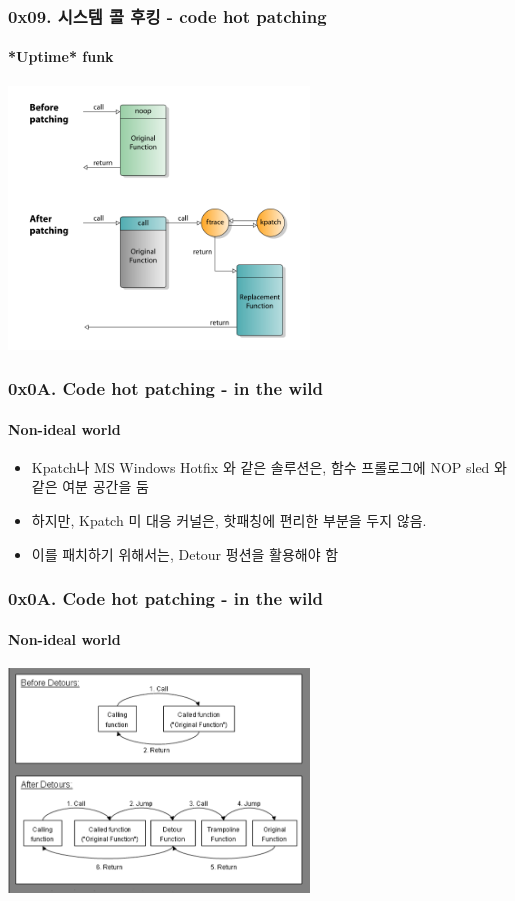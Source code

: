 \begin{frame}
  \frametitle{0x09. 시스템 콜 후킹 - code hot patching}
  \framesubtitle{*Uptime* funk}

  \begin{center}
    \includegraphics [width=80mm]{img/Linux_kernel_live_patching_kpatch.png}\cite{kpatch}
  \end{center}
\end{frame}

\begin{frame}
  \frametitle{0x0A. Code hot patching - in the wild}
  \framesubtitle{Non-ideal world}

  \begin{itemize}
  \item <1-> Kpatch나 MS Windows Hotfix 와 같은 솔루션은, 함수 프롤로그에 NOP sled 와 같은 여분 공간을 둠
  \item <2-> 하지만, Kpatch 미 대응 커널은, 핫패칭에 편리한 부분을 두지 않음.
  \item <3-> 이를 패치하기 위해서는, Detour 펑션을 활용해야 함
  \end{itemize}
\end{frame}

\begin{frame}
  \frametitle{0x0A. Code hot patching - in the wild}
  \framesubtitle{Non-ideal world}

  \begin{center}
    \includegraphics [width=80mm]{img/detour_nagareshwar_securityxploded_com.png}\cite{codeinject}
  \end{center}
\end{frame}

